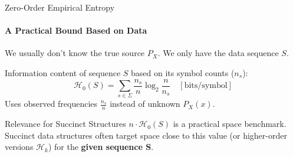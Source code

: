 \begin{frame}{Zero-Order Empirical Entropy}
    \framesubtitle{A Practical Bound Based on Data}
    We usually don't know the true source $P_X$. We only have the data sequence $S$.
    \pause
    \begin{definition}
        Information content of sequence $S$ based on its symbol counts ($n_s$):
        \[ \mathcal{H}_0(S) = \sum_{s \in \Sigma} \frac{n_s}{n} \log_2 \frac{n}{n_s} \quad [\text{bits/symbol}] \]
        Uses observed frequencies $\frac{n_s}{n}$ instead of unknown $P_X(x)$.
    \end{definition}
    \pause
    \begin{alertblock}{Relevance for Succinct Structures}
        $n \cdot \mathcal{H}_0(S)$ is a practical space benchmark. Succinct data structures often target space close to this value (or higher-order versions $\mathcal{H}_k$) for the \textbf{given sequence S}.
    \end{alertblock}
\end{frame}
